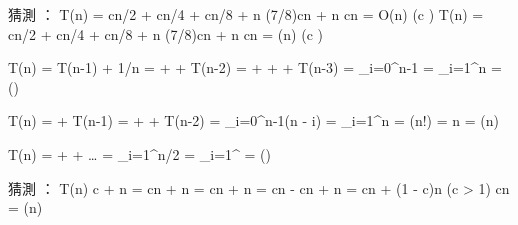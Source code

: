 \item {}

\startANSWER
猜測 ：
\startformula\startmathalignment
\NC T(n) \NC = cn/2 + cn/4 + cn/8 + n \le (7/8)cn + n \le cn = O(n) \quad (c ) \NR
\NC T(n) \NC = cn/2 + cn/4 + cn/8 + n \ge (7/8)cn + n \ge cn = \Omega(n) \quad (c ) \NR
\stopmathalignment\stopformula
\stopANSWER

\item {}

\startANSWER
\startformula\startmathalignment
\NC T(n) \NC= T(n-1) + 1/n \NR
\NC      \NC=  +  + T(n-2) \NR
\NC      \NC=  +  +  + T(n-3) \NR
\NC      \NC= \sum_{i=0}^{n-1} \NR
\NC      \NC= \sum_{i=1}^n \NR
\NC      \NC= \Theta()
\stopmathalignment\stopformula
\stopANSWER

\item {}

\startANSWER
\startformula\startmathalignment
\NC T(n) \NC=  + T(n-1) \NR
\NC      \NC=  +  + T(n-2) \NR
\NC      \NC= \sum_{i=0}^{n-1}\lg(n - i) \NR
\NC      \NC= \sum_{i=1}^{n} \NR
\NC      \NC= \lg(n!) \le {} \NR
\NC      \NC= n \NR
\NC      \NC= \Theta(n) \NR
\stopmathalignment\stopformula
\stopANSWER

\item {}

\startANSWER
\startformula\startmathalignment
\NC T(n) \NC=  +  + \ldots \NR
\NC      \NC= \sum_{i=1}^{n/2} \NR
\NC      \NC= \sum_{i=1}^{\infty} \NR
\NC      \NC= \Theta(\lg{}) \NR
\stopmathalignment\stopformula
\stopANSWER

\item {}

\startANSWER
猜測 ：
\startformula\startmathalignment
\NC T(n) \NC\le {}c\lg\lg{} + n \NR
\NC      \NC= cn\lg\lg{} + n \NR
\NC      \NC= cn\lg{} + n \NR
\NC      \NC= cn\lg{} - cn + n \NR
\NC      \NC= cn\lg{} + (1 - c)n \quad (c > 1) \NR
\NC      \NC\le cn\lg{} \NR
\NC      \NC= \Theta(n\lg{}) \NR
\stopmathalignment\stopformula
\stopANSWER

\stopigBase
\stopPROBLEM

